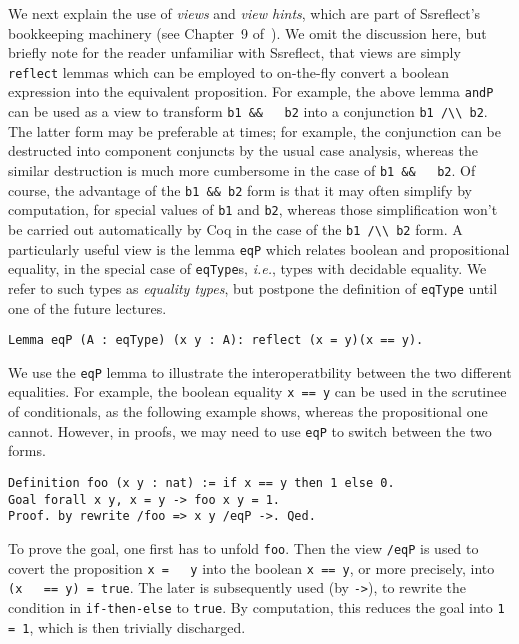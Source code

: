 \documentclass[blockstyle,preprint,nocopyrightspace]{sigplanconf}
\newcommand{\is}[1]{\textcolor{blue}{(Ilya: {#1})}}
\newcommand{\an}[1]{\textcolor{red}{(Aleks: {#1})}}
\newcommand{\code}[1]{\lstinline{#1}}
\newcommand{\ie}{\emph{i.e.}\xspace}
\begin{document}
We next explain the use of \emph{views} and \emph{view hints}, which
are part of Ssreflect's bookkeeping machinery (see Chapter~9
of~\cite{Gonthier-al:TR}). We omit the discussion here, but briefly
note for the reader unfamiliar with Ssreflect, that views are simply
\code{reflect} lemmas which can be employed to on-the-fly convert a
boolean expression into the equivalent proposition. For example, the
above lemma \code{andP} can be used as a view to transform \code{b1 &&
  b2} into a conjunction \code{b1 /\\ b2}. The latter form may be
preferable at times; for example, the conjunction can be destructed
into component conjuncts by the usual case analysis, whereas the
similar destruction is much more cumbersome in the case of \code{b1 &&
  b2}. Of course, the advantage of the \code{b1 && b2} form is that it
may often simplify by computation, for special values of \code{b1} and
\code{b2}, whereas those simplification won't be carried out
automatically by Coq in the case of the \code{b1 /\\ b2} form.  A
particularly useful view is the lemma \code{eqP} which relates boolean
and propositional equality, in the special case of \code{eqType}s,
\ie, types with decidable equality. We refer to such types as
\emph{equality types}, but postpone the definition of \code{eqType}
until one of the future lectures.
\begin{lstlisting}
Lemma eqP (A : eqType) (x y : A): reflect (x = y)(x == y).
\end{lstlisting}
We use the \code{eqP} lemma to illustrate the interoperatbility
between the two different equalities. For example, the boolean
equality \code{x == y} can be used in the scrutinee of conditionals,
as the following example shows, whereas the propositional one
cannot. However, in proofs, we may need to use \code{eqP} to switch
between the two forms.
%
\begin{lstlisting}
Definition foo (x y : nat) := if x == y then 1 else 0.
Goal forall x y, x = y -> foo x y = 1.
Proof. by rewrite /foo => x y /eqP ->. Qed.
\end{lstlisting}
%
To prove the goal, one first has to unfold \code{foo}.
%
%
Then the view \code{/eqP} is used to covert the proposition \code{x =
  y} into the boolean \code{x == y}, or more precisely, into \code{(x
  == y) = true}.  The later is subsequently used (by \code{->}), to
rewrite the condition in \code{if-then-else} to \code{true}. By
computation, this reduces the goal into \code{1 = 1}, which is then
trivially discharged.
%
\end{document}
